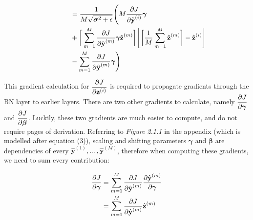 \documentclass{article}
\begin{document}
\begin{multicols}{2}
\begin{equation}
    \begin{aligned}
        \ \ \ \ \ \ \ \ \ \  & = {1\over M\sqrt{\boldsymbol{\sigma}^2 + \epsilon}}\Bigg(M{\partial J  \over \partial \hat{\textbf{y}}^{(i)}}\boldsymbol{\gamma} \\
        & + \bigg[\sum_{m=1}^M{\partial J  \over \partial \hat{\textbf{y}}^{(m)}}\boldsymbol{\gamma}\hat{\textbf{z}}^{(m)}\bigg]
        \Bigg[\bigg[{1\over M}\sum_{m=1}^M\hat{\textbf{z}}^{(m)}\bigg] -  \hat{\textbf{z}}^{(i)}\Bigg] \\
        & - \sum_{m=1}^M{\partial J  \over \partial \hat{\textbf{y}}^{(m)}}\boldsymbol{\gamma}\Bigg)
    \end{aligned}
\end{equation}

This gradient calculation for $\begin{aligned}
    {\partial J \over \partial \textbf{z}^{(i)}}
\end{aligned}$ is required to propagate gradients through the BN layer to 
earlier layers. There are two other gradients to calculate, namely $\begin{aligned}
    {\partial J \over \partial \boldsymbol{\gamma}}
\end{aligned}$ and $\begin{aligned}
    {\partial J \over \partial \boldsymbol{\beta}}
\end{aligned}$. Luckily, these two gradients are much easier to compute, 
and do not require pages of derivation. Referring to \textit{Figure 2.1.1} in 
the appendix (which is modelled after equation (3)), scaling and shifting parameters
$\boldsymbol{\gamma}$ and $\boldsymbol{\beta}$ are dependencies of 
every $\hat{\textbf{y}}^{(1)}, ... \ , \hat{\textbf{y}}^{(M)} $, therefore when 
computing these gradients, we need to sum every contribution:

\begin{equation}
    \begin{aligned}
        {\partial J \over \partial \boldsymbol{\gamma}}
        & =
        \sum_{m=1}^M{\partial J\over \partial \hat{\textbf{y}}^{(m)}}
        {\partial \hat{\textbf{y}}^{(m)} \over \partial \boldsymbol{\gamma}} \\
        & =
        \sum_{m=1}^M{\partial J\over \partial \hat{\textbf{y}}^{(m)}}
        \hat{\textbf{z}}^{(m)} 
    \end{aligned}
\end{equation}


\end{multicols}
\end{document}
